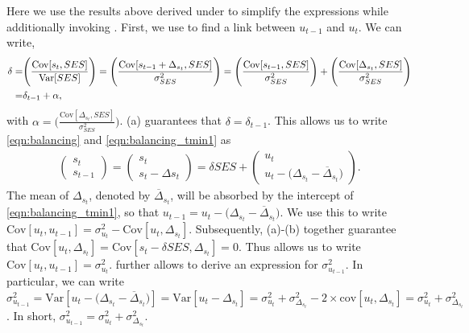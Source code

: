 Here we use the results above derived under  to simplify the expressions while additionally invoking .
%
First, we use  to find a link between $u_{t-1}$ and $u_{t}$. We can write,
\begin{align} \label{eqn:alpha}
    \delta =&\Bigg(\frac{\mathrm{Cov}[s_{t},SES]}{\mathrm{Var}[SES]}\Bigg)
    =\Bigg(\frac{\mathrm{Cov}[s_{t-1}+\Delta_{s_{t}},SES]}{\sigma_{SES}^2}\Bigg)  
    = \Bigg(\frac{\mathrm{Cov}[s_{t-1},SES]}{\sigma_{SES}^2}\Bigg) + \Bigg(\frac{\mathrm{Cov}[\Delta_{s_{t}},SES]}{\sigma_{SES}^2}\Bigg) \\ \notag
     =& \delta_{t-1} + \alpha,
\end{align}
with $\alpha=\Bigg(\frac{\mathrm{Cov}[\Delta_{s_{t}},SES]}{\sigma_{SES}^2}\Bigg)$. (a) guarantees that $\delta=\delta_{t-1}$. This allows us to write \eqref{eqn:balancing} and \eqref{eqn:balancing_tmin1} as
\begin{align} \label{eqn:balancing_both}
 \begin{pmatrix} s_{t} \\ s_{t-1} \end{pmatrix}= \begin{pmatrix} s_{t} \\ s_{t}-\Delta{s_{t}} \end{pmatrix}= \delta SES +  \begin{pmatrix}  u_{t}  \\ u_{t}-\big(\Delta_{s_{t}}-\overline{\Delta}_{s_{t}}\big) \end{pmatrix}.
\end{align} 
The mean of  $\Delta_{s_{t}}$, denoted by $\overline{\Delta}_{s_{t}}$, will be absorbed by the intercept of \eqref{eqn:balancing_tmin1}, so that $u_{t-1}=u_{t}-\big(\Delta_{s_{t}}-\overline{\Delta}_{s_{t}}\big)$. We use this to write $\mathrm{Cov}[u_{t},u_{t-1}]=\sigma_{u_{t}}^2-\mathrm{Cov}[u_{t},\Delta_{s_{t}}]$. Subsequently, (a)-(b) together guarantee that $\mathrm{Cov}[u_{t},\Delta_{s_{t}}]=\mathrm{Cov}[s_t-\delta SES,\Delta_{s_{t}}]=0$. Thus  allows us to write $\mathrm{Cov}[u_{t},u_{t-1}]=\sigma_{u_{t}}^2$. 
%
 further allows to derive an expression for $\sigma_{u_{t-1}}^2$. In particular, we can write $\sigma_{u_{t-1}}^2=\mathrm{Var}[u_{t}-\big(\Delta_{s_{t}}-\overline{\Delta}_{s_{t}}\big)]=\mathrm{Var}[u_{t}-\Delta_{s_t}]=\sigma_{u_{t}}^2+ \sigma_{\Delta_{s_t}}^2 -2 \times \mathrm{cov}[u_{t},\Delta_{s_t}]=\sigma_{u_{t}}^2+ \sigma_{\Delta_{s_t}}^2$. In short, $\sigma_{u_{t-1}}^2=\sigma_{u_{t}}^2+ \sigma_{\Delta_{s_t}}^2$.

